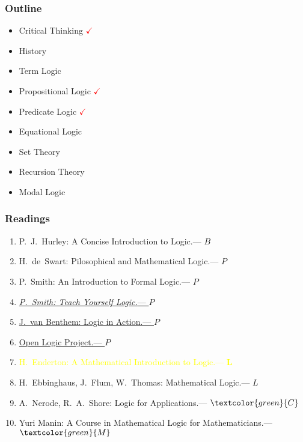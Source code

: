 \documentclass[UTF8,aspectratio=43,11pt,colorlinks,compress,openany]{beamer}%
\begin{document}
\begin{frame}\frametitle{Outline}
	\begin{itemize}
		\item Critical Thinking \textcolor{red}{$\checkmark$}
		\item History
		\item Term Logic
		\item Propositional Logic \textcolor{red}{$\checkmark$}
		\item Predicate Logic \textcolor{red}{$\checkmark$}
		\item Equational Logic
		\item Set Theory
		\item Recursion Theory
		\item Modal Logic
	\end{itemize}
\end{frame}

\begin{frame}\frametitle{Readings}
		\begin{enumerate}
			\item P.~J.~Hurley: A Concise Introduction to Logic.\hfill --- $B$
			\item H.~de~Swart: Pilosophical and Mathematical Logic.\hfill --- $P$
			\item P.~Smith: An Introduction to Formal Logic.\hfill --- $P$
			\item \href{http://www.logicmatters.net/tyl}{\emph{P.~Smith: Teach Yourself Logic.}\hfill --- $P$}
			\item \href{http://www.logicinaction.org}{J.~van Benthem: Logic in Action.\hfill --- $P$}
			\item \href{http://builds.openlogicproject.org}{Open Logic Project.\hfill --- $P$}
			\item \textcolor{yellow}{H.~Enderton: A Mathematical Introduction to Logic.\hfill --- $\textbf{L}$}
			\item H.~Ebbinghaus, J.~Flum, W.~Thomas: Mathematical Logic.\hfill --- $L$
			\item A.~Nerode, R.~A.~Shore: Logic for Applications.\hfill --- $\textcolor{green}{C}$
			\item Yuri Manin: A Course in Mathematical Logic for Mathematicians.\hfill --- $\textcolor{green}{M}$
		\end{enumerate}
\end{frame}
\end{document}

